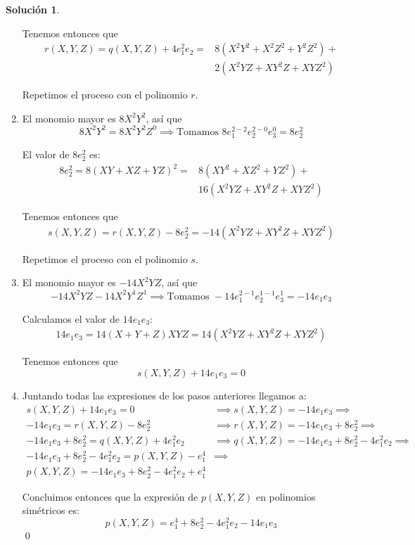 \documentclass[a4paper, 11pt]{article}
\theoremstyle{definition}
\newtheorem*{solucion}{Solución}
\theoremstyle{remark}
\begin{document}
\begin{solucion}
\begin{enumerate}
          Tenemos entonces que
          \begin{align*}
              r(X,Y,Z) = q(X,Y,Z) + 4e_1^2e_2 = &8(X^2Y^2 + X^2Z^2 + Y^2Z^2) +\\
                                                &2(X^2YZ + XY^2Z + XYZ^2)
          \end{align*}

          Repetimos el proceso con el polinomio $r$.

          \item El monomio mayor es $8X^2Y^2$, así que
          \[
          8X^2Y^2 = 8X^2Y^2Z^0 \implies \textrm{Tomamos } 8e_1^{2-2}e_2^{2-0}e_3^0 = 8e_2^2
          \]

          El valor de $8e_2^2$ es:
          \begin{align*}
              8e_2^2 = 8(XY+XZ+YZ)^2 = &8(XY^2+XZ^2+YZ^2) +\\
                                      &16(X^2YZ+XY^2Z+XYZ^2)
          \end{align*}

          Tenemos entonces que
          \begin{align*}
              s(X,Y,Z) = r(X,Y,Z) - 8e_2^2 = -14(X^2YZ+XY^2Z+XYZ^2)
          \end{align*}

          Repetimos el proceso con el polinomio $s$.

          \item El monomio mayor es $-14X^2YZ$, así que
          \[
          -14X^2YZ -14X^2Y^1Z^1 \implies \textrm{Tomamos } -14e_1^{2-1}e_2^{1-1}e_3^1 = -14e_1e_3
          \]

          Calculamos el valor de $14e_1e_3$:
          \begin{align*}
              14e_1e_3 = 14(X + Y + Z)XYZ = 14(X^2YZ + XY^2Z + XYZ^2)
          \end{align*}

          Tenemos entonces que
          \[
          s(X,Y,Z) + 14e_1e_3 = 0
          \]

          \item Juntando todas las expresiones de los pasos anteriores llegamos a:
          \begin{align*}
              s(X,Y,Z) + 14e_1e_3 = 0 &\implies s(X,Y,Z) = -14e_1e_3 \implies\\
              -14e_1e_3 = r(X,Y,Z) - 8e_2^2 &\implies r(X,Y,Z) = -14e_1e_3 + 8e_2^2 \implies\\
              -14e_1e_3 + 8e_2^2 = q(X,Y,Z) + 4e_1^2e_2 &\implies q(X,Y,Z) = -14e_1e_3 + 8e_2^2 - 4e_1^2e_2 \implies\\
              -14e_1e_3 + 8e_2^2 - 4e_1^2e_2 = p(X,Y,Z) - e_1^4 &\implies\\
              p(X,Y,Z) = -14e_1e_3 + 8e_2^2 - 4e_1^2e_2 + e_1^4
          \end{align*}

          Concluimos entonces que la expresión de $p(X,Y,Z)$ en polinomios simétricos es:
          \[
          p(X,Y,Z) = e_1^4 + 8e_2^2 - 4e_1^2e_2 - 14e_1e_3
          \]
          \qed
      \end{enumerate}
  \end{solucion}
\end{document}
